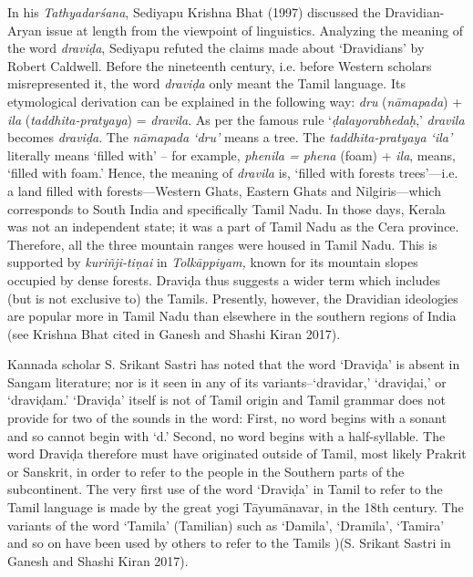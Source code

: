 In his \textit{Tathyadarśana}, Sediyapu Krishna Bhat (1997) discussed the Dravidian-Aryan issue at length from the viewpoint of linguistics. Analyzing the meaning of the word \textit{draviḍa}, Sediyapu refuted the claims made about ‘Dravidians’ by Robert Caldwell. Before the nineteenth century, i.e. before Western scholars misrepresented it, the word \textit{draviḍa} only meant the Tamil language. Its etymological derivation can be explained in the following way: \textit{dru} (\textit{nāmapada}) + \textit{ila} (\textit{taddhita-pratyaya}) = \textit{dravila}. As per the famous rule ‘\textit{ḍalayorabhedaḥ},’ \textit{dravila} becomes \textit{draviḍa}. The \textit{nāmapada ‘dru’} means a tree. The \textit{taddhita-pratyaya ‘ila’} literally means ‘filled with’ – for example, \textit{phenila = phena} (foam) + \textit{ila}, means, ‘filled with foam.’ Hence, the meaning of \textit{dravila} is, ‘filled with forests trees’—i.e. a land filled with forests—Western Ghats, Eastern Ghats and Nilgiris—which corresponds to South India and specifically Tamil Nadu. In those days, Kerala was not an independent state; it was a part of Tamil Nadu as the Cera province. Therefore, all the three mountain ranges were housed in Tamil Nadu. This is supported by \textit{kuriñji-tiṇai} in \textit{Tolkāppiyam,} known for its mountain slopes occupied by dense forests. Draviḍa thus suggests a wider term which includes (but is not exclusive to) the Tamils. Presently, however, the Dravidian ideologies are popular more in Tamil Nadu than elsewhere in the southern regions of India (see Krishna Bhat cited in Ganesh and Shashi Kiran 2017).

Kannada scholar S. Srikant Sastri has noted that the word ‘Draviḍa’ is absent in Sangam literature; nor is it seen in any of its variants--‘dravidar,’ ‘draviḍai,’ or ‘draviḍam.’ ‘Draviḍa’ itself is not of Tamil origin and Tamil grammar does not provide for two of the sounds in the word: First, no word begins with a sonant and so cannot begin with ‘d.’ Second, no word begins with a half-syllable. The word Draviḍa therefore must have originated outside of Tamil, most likely Prakrit or Sanskrit, in order to refer to the people in the Southern parts of the subcontinent. The very first use of the word ‘Draviḍa’ in Tamil to refer to the Tamil language is made by the great yogi Tāyumānavar, in the 18th century. The variants of the word ‘Tamila’ (Tamilian) such as ‘Damila’, ‘Dramila’, ‘Tamira’ and so on have been used by others to refer to the Tamils )(S. Srikant Sastri in Ganesh and Shashi Kiran 2017).

